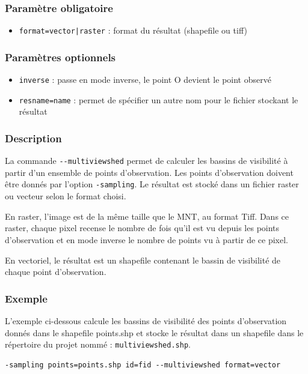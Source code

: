 \documentclass{report}
\begin{document}
\subsubsection{Paramètre obligatoire}
\begin{itemize}
	\item \verb/format=vector|raster/ : format du résultat (shapefile ou tiff)
\end{itemize}

\subsubsection{Paramètres optionnels}
\begin{itemize}
	\item \verb|inverse| : passe en mode inverse, le point O devient le point observé
	\item \verb|resname=name| : permet de spécifier un autre nom pour le fichier stockant le résultat
\end{itemize}

\subsubsection{Description}
La commande \verb|--multiviewshed| permet de calculer les bassins de visibilité à partir d'un ensemble de points d'observation. Les points d'observation doivent être donnés par l'option \verb|-sampling|. Le résultat est stocké dans un fichier raster ou vecteur selon le format choisi. 

En raster, l'image est de la même taille que le MNT, au format Tiff. Dans ce raster, chaque pixel recense le nombre de fois qu'il est vu depuis les points d'observation et en mode inverse le nombre de points vu à partir de ce pixel.

En vectoriel, le résultat est un shapefile contenant le bassin de visibilité de chaque point d'observation.

\subsubsection{Exemple}
L'exemple ci-dessous calcule les bassins de visibilité des points d'observation donnés dans le shapefile points.shp et stocke le résultat dans un shapefile dans le répertoire du projet nommé : \verb|multiviewshed.shp|.
\begin{Verbatim}
-sampling points=points.shp id=fid --multiviewshed format=vector
\end{Verbatim}
\end{document}
